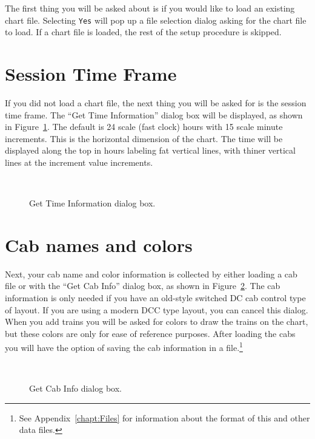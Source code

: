The first thing you will be asked about is if you would like to load an
existing chart file.  Selecting {\tt Yes} will pop up a file selection
dialog asking for the chart file to load.  If a chart file is loaded,
the rest of the setup procedure is skipped.

\section{Session Time Frame}

If you did not load a chart file, the next thing you will be asked for
is the session time frame.  The ``Get Time Information'' dialog box
will be displayed, as shown in Figure~\ref{fig:getTimeDialog}.  The
default is 24 scale (fast clock) hours with 15 scale minute increments.
This is the horizontal dimension of the chart.  The time will be
displayed along the top in hours labeling fat vertical lines, with
thiner vertical lines at the increment value increments.

\begin{figure}
\begin{centering}
\\
\caption{Get Time Information dialog box.}
\label{fig:getTimeDialog}
\end{centering}
\end{figure}

\section{Cab names and colors}

Next, your cab name and color information is collected by either
loading a cab file or with the ``Get Cab Info'' dialog box, as shown in
Figure~\ref{fig:getCabInfoDialog}.  The cab information is only needed
if you have an old-style switched DC cab control type of layout.  If you
are using a modern DCC type layout, you can cancel this dialog.  When
you add trains you will be asked for colors to draw the trains on the
chart, but these colors are only for ease of reference purposes.  After
loading the cabs you will have the option of saving the cab information
in a file.\footnote{See Appendix~\ref{chapt:Files} for information about
the format of this and other data files.}

\begin{figure}
\begin{centering}
\\
\caption{Get Cab Info dialog box.}
\label{fig:getCabInfoDialog}
\end{centering}
\end{figure}

